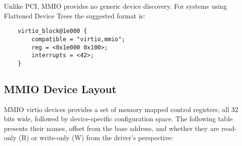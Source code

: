 Unlike PCI, MMIO provides no generic device discovery. For
systems using Flattened Device Trees the suggested format is:

\begin{lstlisting}
	virtio_block@1e000 {
		compatible = "virtio,mmio";
		reg = <0x1e000 0x100>;
		interrupts = <42>;
	}
\end{lstlisting}

\subsection{MMIO Device Layout}\label{sec:Virtio Transport Options / Virtio Over MMIO / MMIO Device Layout}

MMIO virtio devices provides a set of memory mapped control
registers, all 32 bits wide, followed by device-specific
configuration space. The following table presents their names,
offset from the base address, and whether they are read-only (R) or write-only (W) from the driver's perspective:

